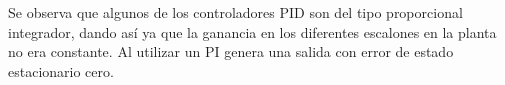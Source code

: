Se observa que algunos de los controladores PID son del tipo proporcional integrador, dando así ya que la ganancia en los diferentes escalones en la planta no era constante. Al utilizar un PI genera una salida con error de estado estacionario cero. 

\begin{comment}
\fcolorbox{red}{yellow}{Estuve viendo las curvas con escalones donde se ve que la ganancia estática se modifica frente a diferentes escalones. Si el objetivo fuese calcular un controlador para ese sistema una buena opción seria un controlador PI. De esta forma, la acción integral va a tratar de hacer que el error de estado estacionario sea cero frente a una entrada escalón. Además, los problemas que pueden existir en el envejecimiento de componentes, errores en el modelado y variaciones en la ganancia estática se van a mitigar con la parte integral del controlador. Obviamente al cambiar la planta la respuesta va a cambiar pero se va a cumplir la consigna de seguir la referencia. Para mostrar esto es posible calcular un controlador para un sistema y luego probar el controlador en los dos sistemas. Eso hice en el pdf que les adjunto con un sistema con 3 polos reales. Más detalles pueden encontrar en el libro de Ogata o Control avanzado de Karl Astrom, capitulo 3.
De esta forma, me da la sensación que para los objetivos de esta materia plantear un controlador PI para un controlador me parece bien.}
\end{comment}



